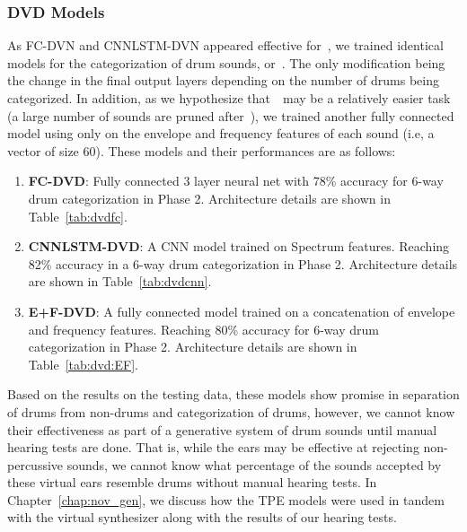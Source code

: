 \documentclass[\main/thesis.tex]{subfiles}
\begin{document}
\subsubsection{DVD Models}
\label{sec:dvd_arch}
As FC-DVN and CNNLSTM-DVN appeared effective for~\decfirst, we trained identical models for the categorization of drum sounds, or~\decsecond. The only modification being the change in the final output layers depending on the number of drums being categorized. In addition, as we hypothesize that~\decsecond~may be a relatively easier task (a large number of sounds are pruned after~\decfirst), we trained another fully connected model using only on the envelope and frequency features of each sound (i.e, a vector of size 60). These models and their performances are as follows:

\begin{enumerate}
\item \textbf{FC-DVD}: Fully connected 3 layer neural net with 78\% accuracy for 6-way drum categorization in Phase 2. Architecture details are shown in Table~\ref{tab:dvdfc}.
\item \textbf{CNNLSTM-DVD}: A CNN model trained on Spectrum features. Reaching 82\% accuracy in a 6-way drum categorization in Phase 2. Architecture details are shown in Table~\ref{tab:dvdcnn}.
\item \textbf{E+F-DVD}: A fully connected model trained on a concatenation of envelope and frequency features. Reaching 80\% accuracy for 6-way drum categorization in Phase 2. Architecture details are shown in Table~\ref{tab:dvd:EF}.
\end{enumerate}
Based on the results on the testing data, these models show promise in separation of drums from non-drums and categorization of drums, however, we cannot know their effectiveness as part of a generative system of drum sounds until manual hearing tests are done. That is, while the ears may be effective at rejecting non-percussive sounds, we cannot know what percentage of the sounds accepted by these virtual ears resemble drums without manual hearing tests. In Chapter~\ref{chap:nov_gen}, we discuss how the TPE models were used in tandem with the virtual synthesizer along with the results of our hearing tests.
\end{document}
